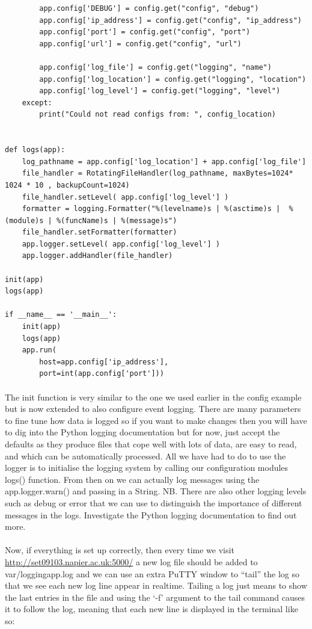 \documentclass[12pt, a4paper, oneside]{book}
\begin{document}
{\begin{lstlisting}
        app.config['DEBUG'] = config.get("config", "debug")
        app.config['ip_address'] = config.get("config", "ip_address")
        app.config['port'] = config.get("config", "port")
        app.config['url'] = config.get("config", "url")

        app.config['log_file'] = config.get("logging", "name")
        app.config['log_location'] = config.get("logging", "location")
        app.config['log_level'] = config.get("logging", "level")
    except:
        print("Could not read configs from: ", config_location)


def logs(app):
    log_pathname = app.config['log_location'] + app.config['log_file']
    file_handler = RotatingFileHandler(log_pathname, maxBytes=1024* 1024 * 10 , backupCount=1024)
    file_handler.setLevel( app.config['log_level'] )
    formatter = logging.Formatter("%(levelname)s | %(asctime)s |  %(module)s | %(funcName)s | %(message)s")
    file_handler.setFormatter(formatter)
    app.logger.setLevel( app.config['log_level'] )
    app.logger.addHandler(file_handler)

init(app)
logs(app)

if __name__ == '__main__':
    init(app)
    logs(app)
    app.run(
        host=app.config['ip_address'], 
        port=int(app.config['port']))
\end{lstlisting}
\paragraph{} The init function is very similar to the one we used earlier in the config example but is now extended to also configure event logging. There are many parameters to fine tune how data is logged so if you want to make changes then you will have to dig into the Python logging documentation but for now, just accept the defaults as they produce files that cope well with lots of data, are easy to read, and which can be automatically processed. All we have had to do to use the logger is to initialise the logging system by calling our configuration modules logs() function. From then on we can actually log messages using the app.logger.warn() and passing in a String. NB. There are also other logging levels such as debug or error that we can use to distinguish the importance of different messages in the logs. Investigate the Python logging documentation to find out more. 

\paragraph{} Now, if everything is set up correctly, then every time we visit \url{http://set09103.napier.ac.uk:5000/} a new log file should be added to var/loggingapp.log and we can use an extra PuTTY window to ``tail'' the log so that we see each new log line appear in realtime. Tailing a log just means to show the last entries in the file and using the `-f' argument to the tail command causes it to follow the log, meaning that each new line is displayed in the terminal like so:

}
\end{document}
